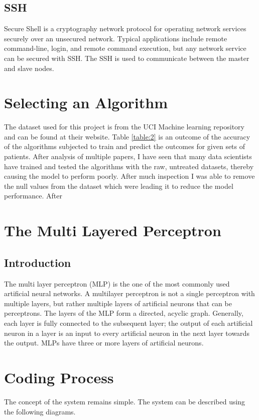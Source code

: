 \documentclass[12pt]{article}
\begin{document}
\subsection{SSH}
Secure Shell is a cryptography network protocol for operating network services securely over an unsecured network. Typical applications include remote command-line, login, and remote command execution, but any network service can be secured with SSH. The SSH is used to communicate between the master and slave nodes.

\newpage
\section{Selecting an Algorithm}
The dataset used for this project is from the UCI Machine learning repository and can be found at their website. Table \ref{table:2} is an outcome of the accuracy of the algorithms subjected to train and predict the outcomes for given sets of patients. After analysis of multiple papers, I have seen that many data scientists have trained and tested the algorithms with the raw, untreated datasets, thereby causing the model to perform poorly. After much inspection I was able to remove the null values from the dataset which were leading it to reduce the model performance. After 

\newpage
\section{The Multi Layered Perceptron}
\subsection{Introduction}
The multi layer perceptron (MLP) is the one of the most commonly used artificial neural networks. A multilayer perceptron is not a single perceptron with multiple layers, but rather multiple layers of artificial neurons that can be perceptrons. The layers of the MLP form a directed, acyclic graph. Generally, each layer is fully connected to the subsequent layer; the output of each artificial neuron in a layer is an input to every artificial neuron in the next layer towards the output. MLPs have three or more layers of artificial neurons.

\newpage
\section{Coding Process}
The concept of the system remains simple. The system can be described using the following diagrams.
\end{document}
